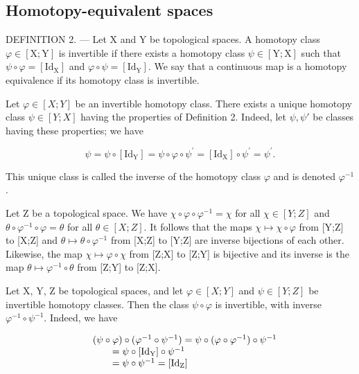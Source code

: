 \subsection{Homotopy-equivalent spaces}

DEFINITION 2. --- Let X and Y be topological spaces. A homotopy class \(\varphi \in [\mathrm{X};\mathrm{Y}]\) is invertible if there exists a homotopy class \(\psi \in [\mathrm{Y};\mathrm{X}]\) such that \(\psi \circ \varphi = [\mathrm{Id}_{\mathrm{X}}]\) and \(\varphi \circ \psi = [\mathrm{Id}_{\mathrm{Y}}]\). We say that a continuous map is a homotopy equivalence if its homotopy class is invertible.

Let \(\varphi\in[X;Y]\) be an invertible homotopy class. There exists a unique homotopy class \(\psi\in[Y;X]\) having the properties of Definition 2. Indeed, let \(\psi,\psi'\) be classes having these properties; we have

\[
\psi = \psi \circ [ \mathrm{Id} _ {\mathrm{Y}} ] = \psi \circ \varphi \circ \psi^ {\prime} = [ \mathrm{Id} _ {\mathrm{X}} ] \circ \psi^ {\prime} = \psi^ {\prime}.
\]

This unique class is called the inverse of the homotopy class \(\varphi\) and is denoted \(\varphi^{-1}\).

Let Z be a topological space. We have \(\chi\circ\varphi\circ\varphi^{-1}=\chi\) for all \(\chi\in[Y;Z]\) and \(\theta\circ\varphi^{-1}\circ\varphi=\theta\) for all \(\theta\in[X;Z].\) It follows that the maps \(\chi\mapsto\chi\circ\varphi\) from {[}Y;Z{]} to {[}X;Z{]} and \(\theta\mapsto\theta\circ\varphi^{-1}\) from {[}X;Z{]} to {[}Y;Z{]} are inverse bijections of each other. Likewise, the map \(\chi\mapsto\varphi\circ\chi\) from {[}Z;X{]} to {[}Z;Y{]} is bijective and its inverse is the map \(\theta\mapsto\varphi^{-1}\circ\theta\) from {[}Z;Y{]} to {[}Z;X{]}.

Let X, Y, Z be topological spaces, and let \(\varphi \in [X;Y]\) and \(\psi \in [Y;Z]\) be invertible homotopy classes. Then the class \(\psi \circ \varphi\) is invertible, with inverse \(\varphi^{-1} \circ \psi^{-1}\). Indeed, we have

\[
\begin{array}{r l} & (\psi \circ \varphi) \circ (\varphi^ {- 1} \circ \psi^ {- 1}) = \psi \circ (\varphi \circ \varphi^ {- 1}) \circ \psi^ {- 1} \\ & \qquad = \psi \circ [ \mathrm{Id} _ {\mathrm{Y}} ] \circ \psi^ {- 1} \\ & \qquad = \psi \circ \psi^ {- 1} = [ \mathrm{Id} _ {\mathrm{Z}} ] \end{array}
\]

